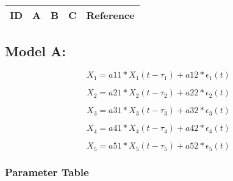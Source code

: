 \centering
\begin{table}[H]\footnotesize
	\caption{}
	\begin{tabular}{rp{1cm}p{2cm}p{3cm}p{1cm}}
		\hline
		ID & A & B & C & Reference \\
		\hline
		\hline
	\end{tabular}
\end{table}
\raggedright

\subsection{Model A:}

\begin{equation}
X_1= a11*X_1(t- \tau_1) + a12*\epsilon_1(t)
\end{equation}

\begin{equation}
X_2= a21*X_2(t- \tau_2) + a22*\epsilon_2(t)
\end{equation}

\begin{equation}
X_3= a31*X_3(t- \tau_3) + a32*\epsilon_3(t)
\end{equation}

\begin{equation}
X_4= a41*X_4(t- \tau_4) + a42*\epsilon_4(t)
\end{equation}

\begin{equation}
X_5= a51*X_5(t- \tau_5) + a52*\epsilon_5(t)
\end{equation}

\subsubsection{Parameter Table}


